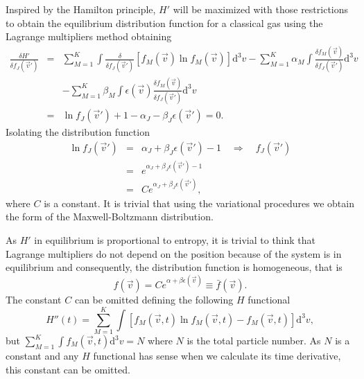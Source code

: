 Inspired by the Hamilton principle, $H'$ will be maximized with those
restrictions to obtain the equilibrium distribution function for a classical gas
using the Lagrange multipliers method obtaining
%
\begin{eqnarray}
    \frac{\delta H'}{\delta f_J(\vec{v}')} & = & \sum_{M=1}^{K}\int
      \frac{\delta}{\delta f_J(\vec{v}')}\left[
        f_M(\vec{v})\ln f_M(\vec{v})
        \right]
       \mathrm{d}^3v -\sum_{M=1}^{K}\alpha_M\int
       	\frac{\delta f_M(\vec{v})}{\delta f_J(\vec{v}')}
      \mathrm{d}^3v\nonumber\\
    & & -\sum_{M=1}^{K}\beta_M\int\epsilon(\vec{v})
    	\frac{\delta f_M(\vec{v})}{\delta f_J(\vec{v}')}
      \mathrm{d}^3v \nonumber\\
    & = & \ln f_J(\vec{v}')+1-\alpha_J-\beta_J \epsilon(\vec{v}')=0.
\end{eqnarray}
%
Isolating the distribution function 
%
\begin{eqnarray}
    \ln f_J(\vec{v}') & = & \alpha_J+\beta_J \epsilon(\vec{v}')
       -1\quad\Rightarrow\quad f_J(\vec{v}')\\
    & = & e^{\alpha_J +\beta_J \epsilon(\vec{v}')-1}\nonumber\\
    & = & Ce^{\alpha_J+\beta_J \epsilon(\vec{v}') } \label{relacion1},
\end{eqnarray}
%
where $C$ is a constant. It is trivial that using the variational procedures we
obtain the form of the Maxwell-Boltzmann distribution. 

As $H'$ in equilibrium is proportional to entropy, it is trivial to think that
Lagrange multipliers do not depend on the position because of the system is in
equilibrium and consequently, the distribution function is homogeneous, that is
%
\begin{equation}
    f(\vec{v})=Ce^{\alpha+\beta \epsilon(\vec{v})}\equiv \bar{f}(\vec{v}).
\end{equation} 
%
The constant $C$ can be omitted defining the following $H$ functional
%
\begin{equation}
   H''(t)=\sum_{M=1}^{K}\int \left[f_M(\vec{v},t)
    \ln f_M(\vec{v},t)-f_M(\vec{v},t)\right]\mathrm{d}^3v  \label{CH3},
\end{equation}
%
but $\sum_{M=1}^{K} \int f_M(\vec{v},t)\mathrm{d}^3v =N$ where $N$ is the
total particle number. As $N$ is a constant and any $H$ functional has sense
when we calculate its time derivative, this constant can be omitted. 

